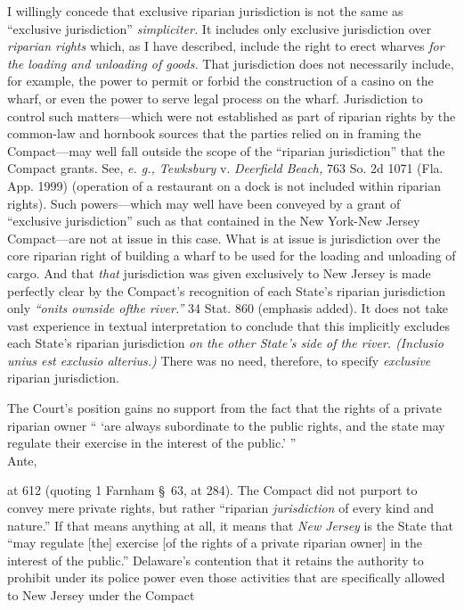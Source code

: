 {  I willingly concede that exclusive riparian jurisdiction is not the
same as ``exclusive jurisdiction'' \emph{simpliciter.} It includes
only exclusive jurisdiction over \emph{riparian rights} which, as I have
described, include the right to erect wharves \emph{for the loading and
unloading of goods.} That jurisdiction does not necessarily include,
for example, the power to permit or forbid the construction of a casino
on the wharf, or even the power to serve legal process on the wharf.
Jurisdiction to control such matters---which were not established as
part of riparian rights by the common-law and \newpage  hornbook sources
that the parties relied on in framing the Compact---may well fall
outside the scope of the ``riparian jurisdiction'' that the Compact
grants. See, \emph{e. g., Tewksbury} v. \emph{Deerfield Beach,} 763 So.
2d 1071 (Fla. App. 1999) (operation of a restaurant on a dock is not
included within riparian rights). Such powers---which may well have
been conveyed by a grant of ``exclusive jurisdiction'' such as that
contained in the New York-New Jersey Compact---are not at issue in this
case. What is at issue is jurisdiction over the core riparian right of
building a wharf to be used for the loading and unloading of cargo.
And that \emph{that} jurisdiction was given exclusively to New Jersey is
made perfectly clear by the Compact's recognition of each State's
riparian jurisdiction only \emph{``onits ownside ofthe river.''} 34
Stat. 860 (emphasis added). It does not take vast experience in
textual interpretation to conclude that this implicitly excludes each
State's riparian jurisdiction \emph{on the other State's side of the
river. (Inclusio unius est exclusio alterius.)} There was no need,
therefore, to specify \emph{exclusive} riparian jurisdiction.

  The Court's position gains no support from the fact that the rights
of a private riparian owner `` ‘are always subordinate to the public
rights, and the state may regulate their exercise in the interest of
the public.' ''\\Ante,} at 612 (quoting 1 Farnham \S~63, at
284). The Compact did not purport to convey mere private rights, but
rather ``riparian \emph{jurisdiction} of every kind and nature.'' If that
means anything at all, it means that \emph{New Jersey} is the State that
``may regulate [the] exercise [of the rights of a private riparian
owner] in the interest of the public.'' Delaware's contention that
it retains the authority to prohibit under its police power even those
activities that are specifically allowed to New Jersey under the Compact
